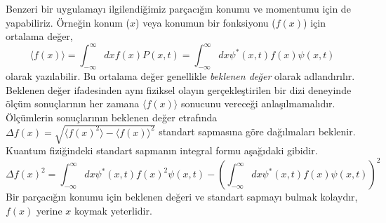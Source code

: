 \documentclass[a4paper,12pt, twoside]{article}
\begin{document}
Benzeri bir uygulamayı ilgilendiğimiz parçacığın konumu ve momentumu için de yapabiliriz. Örneğin konum ($x$) veya konumun bir fonksiyonu ($f(x)$) için ortalama değer,
\begin{equation}
\langle f(x) \rangle =\int ^{\infty }_{-\infty }dx f(x) P\left( x,t\right) =\int ^{\infty }_{-\infty }dx \psi^{\ast }\left(x,t\right) f(x) \psi \left( x,t\right)
\label{eq:expactation_value}
\end{equation}
olarak yazılabilir. Bu ortalama değer genellikle \emph{beklenen değer} olarak adlandırılır. Beklenen değer ifadesinden aynı fiziksel olayın gerçekleştirilen bir dizi deneyinde ölçüm sonuçlarının her zamana $\langle f(x) \rangle$ sonucunu vereceği anlaşılmamalıdır. Ölçümlerin sonuçlarının beklenen değer etrafında $\Delta f(x) = \sqrt{\langle f(x)^2 \rangle - \langle f(x) \rangle^2}$ standart sapmasına göre dağılmaları beklenir. Kuantum fiziğindeki standart sapmanın integral formu aşağıdaki gibidir.
\begin{equation}
\Delta f(x)^2 = \int ^{\infty }_{-\infty }dx \psi^{\ast }\left(x,t\right) f(x)^2 \psi \left( x,t\right) -\left( \int ^{\infty }_{-\infty }dx \psi^{\ast }\left(x,t\right) f(x) \psi \left( x,t\right)\right)^2
\end{equation}
Bir parçacığın konumu için beklenen değeri ve standart sapmayı bulmak kolaydır, $f(x)$ yerine $x$ koymak yeterlidir. 
\end{document}
